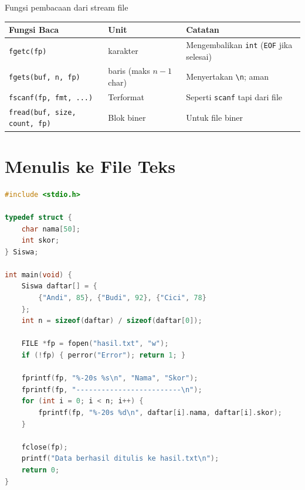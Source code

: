 \documentclass[../main.tex]{subfiles}
\begin{document}
\begin{modultable}[]{Fungsi pembacaan dari stream file}
{\small
\begin{tabular}{|>{\raggedright\arraybackslash}p{3.0cm}|>{\raggedright\arraybackslash}p{3.2cm}|>{\raggedright\arraybackslash}p{6.5cm}|}
\hline
\textbf{Fungsi Baca} & \textbf{Unit} & \textbf{Catatan} \\
\hline
\texttt{fgetc(fp)} & 1 karakter & Mengembalikan \texttt{int} (\texttt{EOF} jika selesai) \\
\hline
\texttt{fgets(buf, n, fp)} & 1 baris (maks $n-1$ char) & Menyertakan \texttt{\textbackslash n}; aman \\
\hline
\texttt{fscanf(fp, fmt, ...)} & Terformat & Seperti \texttt{scanf} tapi dari file \\
\hline
\texttt{fread(buf, size, count, fp)} & Blok biner & Untuk file biner \\
\hline
\end{tabular}
}
\end{modultable}

\section{Menulis ke File Teks}

\begin{lstlisting}[language=C,caption=Menulis data ke file]
#include <stdio.h>

typedef struct {
    char nama[50];
    int skor;
} Siswa;

int main(void) {
    Siswa daftar[] = {
        {"Andi", 85}, {"Budi", 92}, {"Cici", 78}
    };
    int n = sizeof(daftar) / sizeof(daftar[0]);
    
    FILE *fp = fopen("hasil.txt", "w");
    if (!fp) { perror("Error"); return 1; }
    
    fprintf(fp, "%-20s %s\n", "Nama", "Skor");
    fprintf(fp, "-------------------------\n");
    for (int i = 0; i < n; i++) {
        fprintf(fp, "%-20s %d\n", daftar[i].nama, daftar[i].skor);
    }
    
    fclose(fp);
    printf("Data berhasil ditulis ke hasil.txt\n");
    return 0;
}
\end{lstlisting}
\end{document}
